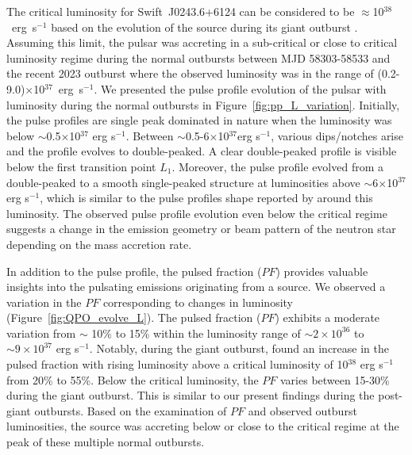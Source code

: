 \documentclass[twocolumn,trackchanges]{aastex631}
\begin{document}
The critical luminosity for Swift~J0243.6+6124 can be considered to be $\approx$10$^{38}$~erg~s$^{-1}$ based on the evolution of the source during its giant outburst \citep{2018ApJ...863....9W}. Assuming this limit, the pulsar was accreting in a sub-critical or close to critical luminosity regime during the normal outbursts between MJD 58303-58533 and the recent 2023 outburst where the observed luminosity was in the range of (0.2-9.0)$\times$10$^{37}$~erg~s$^{-1}$.  We presented the pulse profile evolution of the pulsar with luminosity during the normal outbursts in Figure~\ref{fig:pp_L_variation}. Initially, the pulse profiles are  single peak dominated in nature when the luminosity was below $\sim$0.5$\times$10$^{37}$ erg s$^{-1}$. Between $\sim$0.5-6$\times$10$^{37}$erg s$^{-1}$, various dips/notches arise and the profile evolves to double-peaked. A clear double-peaked profile is visible below the first transition point $L_{1}$. Moreover, the pulse profile evolved from a double-peaked to a smooth single-peaked structure at luminosities above $\sim$6$\times$10$^{37}$ erg s$^{-1}$,  which is similar to the pulse profiles shape reported by \citep{2018ApJ...863....9W} around this luminosity. The observed pulse profile evolution even below the critical regime suggests a change in the emission geometry or beam pattern of the neutron star depending on the mass accretion rate.





In addition to the pulse profile, the pulsed fraction ($PF$)  provides valuable insights into the pulsating emissions originating from a source. We observed a variation in the $PF$ corresponding to changes in luminosity (Figure~\ref{fig:QPO_evolve_L}). The pulsed fraction ($PF$)  exhibits a moderate variation from  $\sim$ 10\% to 15\% within the luminosity range of  $\sim2\times10^{36}$ to $\sim9\times10^{37}$ erg s$^{-1}$.  
Notably, during the giant outburst, \citet{2018ApJ...863....9W} found an increase in the pulsed fraction with rising luminosity above a critical luminosity of 10$^{38}$ erg s$^{-1}$ from 20\% to 55\%. Below the critical luminosity, the $PF$ varies between 15-30\% during the giant outburst. This is similar to our present findings during the post-giant outbursts. Based on the examination of $PF$ and observed outburst luminosities, the source was accreting below or close to the critical regime at the peak of these multiple normal outbursts. 
\end{document}
